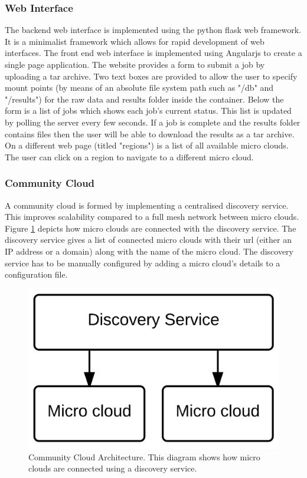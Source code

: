 \documentclass{sig-alternate-05-2015}
\begin{document}
\subsubsection{Web Interface}
The backend web interface is implemented using the python flask web framework. It is a minimalist framework which allows for rapid development of web interfaces. 
The front end web interface is implemented using Angularjs to create a single page application. The website provides a form to submit a job by uploading a tar archive. Two text boxes are provided to allow the user to specify mount points (by means of an absolute file system path such as "/db" and "/results") for the raw data and results folder inside the container. Below the form is a list of jobs which shows each job's current status. This list is updated by polling the server every few seconds. If a job is complete and the results folder contains files then the user will be able to download the results as a tar archive. On a different web page (titled "regions") is a list of all available micro clouds. The user can click on a region to navigate to a different micro cloud.

\subsubsection{Community Cloud}
A community cloud is formed by implementing a centralised discovery service. This improves scalability compared to a full mesh network between micro clouds. Figure \ref{fig:discovery} depicts how micro clouds are connected with the discovery service. The discovery service gives a list of connected micro clouds with their url (either an IP address or a domain) along with the name of the micro cloud. The discovery service has to be manually configured by adding a micro cloud's details to a configuration file.

\begin{figure}
\centering
\includegraphics[scale=0.3]{img/communitycloud}
\caption{Community Cloud Architecture. This diagram shows how micro clouds are connected using a discovery service.}
\label{fig:discovery}
\end{figure}
\end{document}
